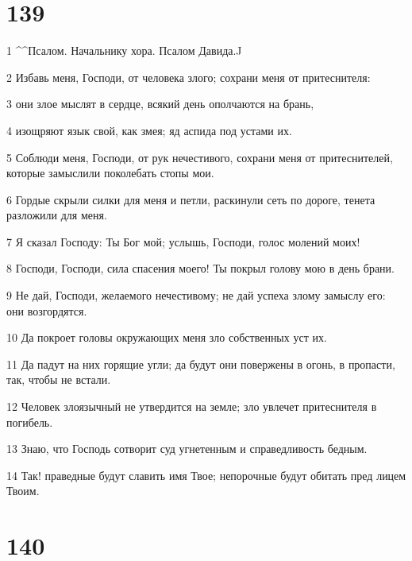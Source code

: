 \chapter{139}

\par 1 ^^Псалом. Начальнику хора. Псалом Давида.^^
\par 2 Избавь меня, Господи, от человека злого; сохрани меня от притеснителя:
\par 3 они злое мыслят в сердце, всякий день ополчаются на брань,
\par 4 изощряют язык свой, как змея; яд аспида под устами их.
\par 5 Соблюди меня, Господи, от рук нечестивого, сохрани меня от притеснителей, которые замыслили поколебать стопы мои.
\par 6 Гордые скрыли силки для меня и петли, раскинули сеть по дороге, тенета разложили для меня.
\par 7 Я сказал Господу: Ты Бог мой; услышь, Господи, голос молений моих!
\par 8 Господи, Господи, сила спасения моего! Ты покрыл голову мою в день брани.
\par 9 Не дай, Господи, желаемого нечестивому; не дай успеха злому замыслу его: они возгордятся.
\par 10 Да покроет головы окружающих меня зло собственных уст их.
\par 11 Да падут на них горящие угли; да будут они повержены в огонь, в пропасти, так, чтобы не встали.
\par 12 Человек злоязычный не утвердится на земле; зло увлечет притеснителя в погибель.
\par 13 Знаю, что Господь сотворит суд угнетенным и справедливость бедным.
\par 14 Так! праведные будут славить имя Твое; непорочные будут обитать пред лицем Твоим.

\chapter{140}

